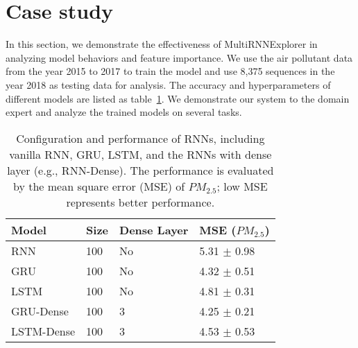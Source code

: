 \section{Case study}

In this section, we demonstrate the effectiveness of MultiRNNExplorer in analyzing model behaviors and feature importance. 
We use the air pollutant data from the year 2015 to 2017 to train the model and use 8,375 sequences in the year 2018 as testing data for analysis. 
The accuracy and hyperparameters of different models are listed as table~\ref{table:model_configuration}. 
We demonstrate our system to the domain expert and analyze the trained models on several tasks.

\begin{table}[h!]
\centering
\caption{Configuration and performance of RNNs, including vanilla RNN, GRU, LSTM, and the RNNs with dense layer (e.g., RNN-Dense). The performance is evaluated by the mean square error (MSE) of $PM_{2.5}$; low MSE represents better performance.}
\begin{tabular}{p{2cm}|p{1cm}|p{2cm}|p{2cm}} 
 \hline
 Model & Size & Dense Layer & MSE ($PM_{2.5}$) \\ [0.5ex] 
 \hline
    RNN&100&No&5.31 $\pm$ 0.98 \\
    GRU&100&No&4.32 $\pm$ 0.51\\
    LSTM&100&No&4.81 $\pm$ 0.31\\
    GRU-Dense&100&3&4.25 $\pm$ 0.21\\
    LSTM-Dense&100&3&4.53 $\pm$ 0.53\\
\hline
\end{tabular}
\label{table:model_configuration}
\end{table}















